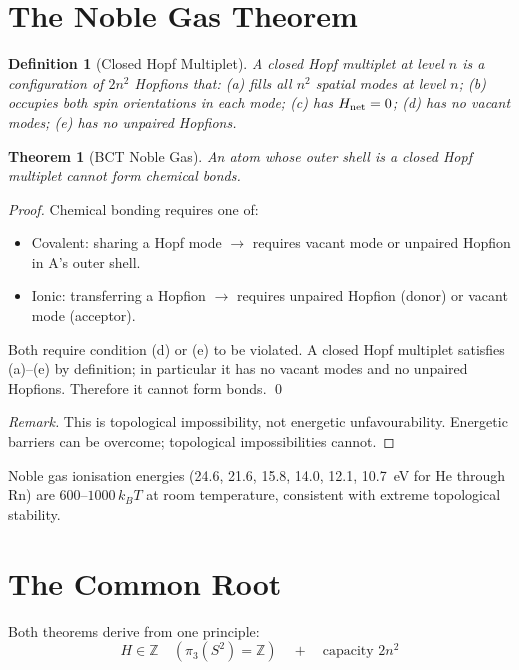 \documentclass[aps,prl,twocolumn,showpacs,superscriptaddress]{revtex4-2}
\newtheorem{theorem}{Theorem}
\newtheorem{definition}{Definition}
\begin{document}
\section{The Noble Gas Theorem}

\begin{definition}[Closed Hopf Multiplet]
A closed Hopf multiplet at level $n$ is a configuration of $2n^2$ 
Hopfions that: (a) fills all $n^2$ spatial modes at level $n$; 
(b) occupies both spin orientations in each mode; 
(c) has $H_{\rm net}=0$; (d) has no vacant modes; 
(e) has no unpaired Hopfions.
\end{definition}

\begin{theorem}[BCT Noble Gas]
An atom whose outer shell is a closed Hopf multiplet cannot 
form chemical bonds.
\end{theorem}

\begin{proof}
Chemical bonding requires one of:
\begin{itemize}
\item[(i)] Covalent: sharing a Hopf mode $\to$ requires vacant 
mode or unpaired Hopfion in A's outer shell.
\item[(ii)] Ionic: transferring a Hopfion $\to$ requires unpaired 
Hopfion (donor) or vacant mode (acceptor).
\end{itemize}
Both require condition (d) or (e) to be violated. A closed 
Hopf multiplet satisfies (a)--(e) by definition; in particular 
it has no vacant modes and no unpaired Hopfions. 
Therefore it cannot form bonds. \qed

\textit{Remark.} This is topological impossibility, not energetic 
unfavourability. Energetic barriers can be overcome; topological 
impossibilities cannot.
\end{proof}

Noble gas ionisation energies (24.6, 21.6, 15.8, 14.0, 12.1, 
10.7~eV for He through Rn) are $600$--$1000\,k_BT$ at room 
temperature, consistent with extreme topological stability.

\section{The Common Root}

Both theorems derive from one principle:
\begin{equation}
    H \in \mathbb{Z} \quad (\pi_3(S^2)=\mathbb{Z})
    \quad + \quad \text{capacity } 2n^2
\end{equation}
\end{document}
